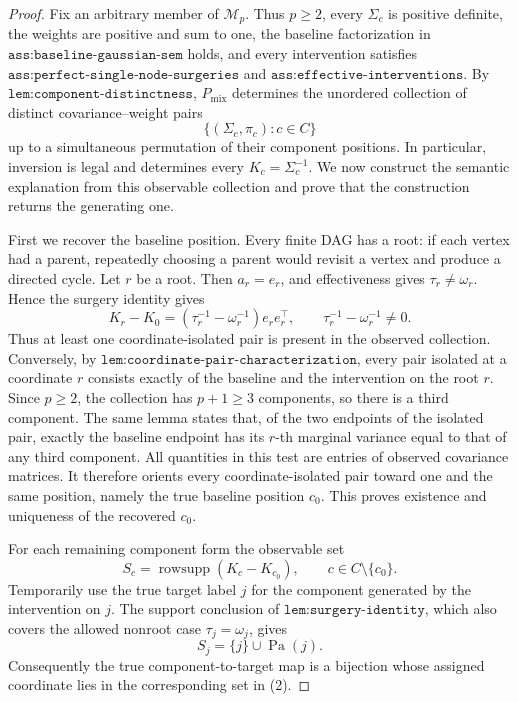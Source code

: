 \documentclass{article}
\begin{document}
\begin{proof}
Fix an arbitrary member of \(\mathcal M_p\).  Thus \(p\geq 2\), every
\(\Sigma_c\) is positive definite, the weights are positive and sum to one,
the baseline factorization in \(\texttt{ass:baseline-gaussian-sem}\) holds,
and every intervention satisfies
\(\texttt{ass:perfect-single-node-surgeries}\) and
\(\texttt{ass:effective-interventions}\).  By
\(\texttt{lem:component-distinctness}\), \(P_{\mathrm{mix}}\) determines the
unordered collection of distinct covariance--weight pairs
\[
 \bigl\{(\Sigma_c,\pi_c):c\in C\bigr\}
\]
up to a simultaneous permutation of their component positions.  In
particular, inversion is legal and determines every
\(K_c=\Sigma_c^{-1}\).  We now construct the semantic explanation from this
observable collection and prove that the construction returns the generating
one.

First we recover the baseline position.  Every finite DAG has a root: if each
vertex had a parent, repeatedly choosing a parent would revisit a vertex and
produce a directed cycle.  Let \(r\) be a root.  Then
\(a_r=e_r\), and effectiveness gives \(\tau_r\neq\omega_r\).  Hence the
surgery identity gives
\[
 K_r-K_0
 =\left(\tau_r^{-1}-\omega_r^{-1}\right)e_re_r^{\top},
 \qquad \tau_r^{-1}-\omega_r^{-1}\neq0.                 \tag{1}
\]
Thus at least one coordinate-isolated pair is present in the observed
collection.  Conversely, by
\(\texttt{lem:coordinate-pair-characterization}\), every pair isolated at a
coordinate \(r\) consists exactly of the baseline and the intervention on the
root \(r\).  Since \(p\geq2\), the collection has \(p+1\geq3\) components, so
there is a third component.  The same lemma states that, of the two endpoints
of the isolated pair, exactly the baseline endpoint has its \(r\)-th marginal
variance equal to that of any third component.  All quantities in this test
are entries of observed covariance matrices.  It therefore orients every
coordinate-isolated pair toward one and the same position, namely the true
baseline position \(c_0\).  This proves existence and uniqueness of the
recovered \(c_0\).

For each remaining component form the observable set
\[
 S_c=\operatorname{rowsupp}(K_c-K_{c_0}),
 \qquad c\in C\setminus\{c_0\}.                         \tag{2}
\]
Temporarily use the true target label \(j\) for the component generated by
the intervention on \(j\).  The support conclusion of
\(\texttt{lem:surgery-identity}\), which also covers the allowed nonroot case
\(\tau_j=\omega_j\), gives
\[
 S_j=\{j\}\cup\operatorname{Pa}(j).                    \tag{3}
\]
Consequently the true component-to-target map is a bijection whose assigned
coordinate lies in the corresponding set in (2).


\end{proof}
\end{document}
